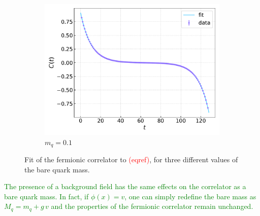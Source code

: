 \begin{figure}
\begin{subfigure}[b]{0.68\textwidth}
        \includegraphics[width=1.05\textwidth]{figures/correlator/corrs_free/corr_medium.pdf}
        \caption{$m_q = 0.1$}        
    \end{subfigure}
    \caption[Fit of the correlator for free Wilson fermions.]{Fit of the fermionic correlator to \textcolor{red}{(eqref)}, for three different values of the bare quark mass.}
    \label{fig:fit_wilson}
\end{figure}
\textcolor{green}{The presence of a background field has the same effects on the correlator as a bare quark mass. In fact, if $\phi(x) = v$, one can simply redefine the bare mass as $M_q = m_q + g \, v$ and the properties of the fermionic correlator remain unchanged.}
\newpage

